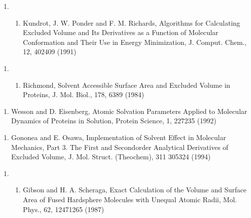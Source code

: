 \documentclass[letterpaper,11pt,english]{sphinxmanual}
\begin{document}
\begin{enumerate}
%
\setcounter{enumi}{2}
\item {} \begin{enumerate}
%
\setcounter{enumii}{4}
\item {} 
Kundrot, J. W. Ponder and F. M. Richards, Algorithms for Calculating Excluded Volume and Its Derivatives as a Function of Molecular Conformation and Their Use in Energy Minimization, J. Comput. Chem., 12, 402\sphinxhyphen{}409 (1991)

\end{enumerate}

\end{enumerate}
\begin{enumerate}
%
\setcounter{enumi}{19}
\item {} \begin{enumerate}
%
\setcounter{enumii}{9}
\item {} 
Richmond, Solvent Accessible Surface Area and Excluded Volume in Proteins, J. Mol. Biol., 178, 63\sphinxhyphen{}89 (1984)

\end{enumerate}

\end{enumerate}
\begin{enumerate}
%
\setcounter{enumi}{11}
\item {} 
Wesson and D. Eisenberg, Atomic Solvation Parameters Applied to Molecular Dynamics of Proteins in Solution, Protein Science, 1, 227\sphinxhyphen{}235 (1992)

\end{enumerate}
\begin{enumerate}
%
\setcounter{enumi}{21}
\item {} 
Gononea and E. Osawa, Implementation of Solvent Effect in Molecular Mechanics, Part 3. The First\sphinxhyphen{} and Second\sphinxhyphen{}order Analytical Derivatives of Excluded Volume, J. Mol. Struct. (Theochem), 311 305\sphinxhyphen{}324 (1994)

\end{enumerate}
\begin{enumerate}
%
\setcounter{enumi}{10}
\item {} \begin{enumerate}
%
\setcounter{enumii}{3}
\item {} 
Gibson and H. A. Scheraga, Exact Calculation of the Volume and Surface Area of Fused Hard\sphinxhyphen{}sphere Molecules with Unequal Atomic Radii, Mol. Phys., 62, 1247\sphinxhyphen{}1265 (1987)

\end{enumerate}

\end{enumerate}
\end{document}
